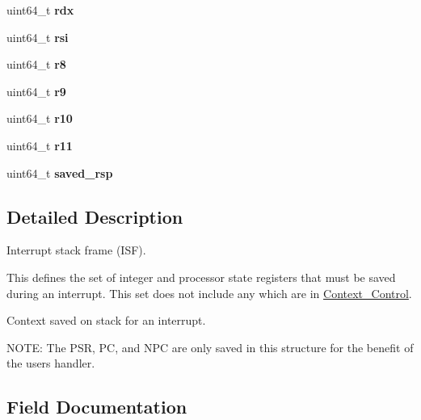 \begin{DoxyCompactItemize}
uint64\+\_\+t {\bfseries rdx}
\item 
\mbox{\label{structCPU__Interrupt__frame_acf98e6e46500021f1b04dbc9da0f2a9d}} 
uint64\+\_\+t {\bfseries rsi}
\item 
\mbox{\label{structCPU__Interrupt__frame_a824ce1d42752eb8a3ccf052411ffd168}} 
uint64\+\_\+t {\bfseries r8}
\item 
\mbox{\label{structCPU__Interrupt__frame_a860700ce5e43e0b36c19be991190852d}} 
uint64\+\_\+t {\bfseries r9}
\item 
\mbox{\label{structCPU__Interrupt__frame_afd41b4924734bbc8ca6cc95bb96b8ea2}} 
uint64\+\_\+t {\bfseries r10}
\item 
\mbox{\label{structCPU__Interrupt__frame_aeea7554dea5e101e0b77a064763b2dcb}} 
uint64\+\_\+t {\bfseries r11}
\item 
\mbox{\label{structCPU__Interrupt__frame_a7ce828dd997ffc59b3744014693d97f7}} 
uint64\+\_\+t {\bfseries saved\+\_\+rsp}
\end{DoxyCompactItemize}


\subsection{Detailed Description}
Interrupt stack frame (I\+SF). 

This defines the set of integer and processor state registers that must be saved during an interrupt. This set does not include any which are in \mbox{\hyperlink{structContext__Control}{Context\+\_\+\+Control}}.

Context saved on stack for an interrupt.

N\+O\+TE\+: The P\+SR, PC, and N\+PC are only saved in this structure for the benefit of the user\textquotesingle{}s handler. 

\subsection{Field Documentation}
\mbox{\label{structCPU__Interrupt__frame_a5b2c2792924d0b58df2497a4f4e37e10}} 

